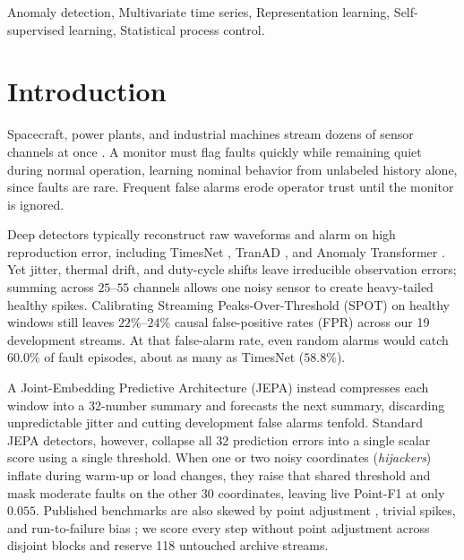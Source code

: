 \documentclass[journal]{IEEEtran}
\begin{document}
\begin{IEEEkeywords}
Anomaly detection, Multivariate time series, Representation learning, Self-supervised learning, Statistical process control.
\end{IEEEkeywords}

\section{Introduction}
\label{sec:intro}

Spacecraft, power plants, and industrial machines stream dozens of sensor channels at once \cite{meng2019spacecraft, chalapathy2019deep, cuellar2024explainable, Hundman2018b}. A monitor must flag faults quickly while remaining quiet during normal operation, learning nominal behavior from unlabeled history alone, since faults are rare. Frequent false alarms erode operator trust until the monitor is ignored.

Deep detectors typically reconstruct raw waveforms and alarm on high reproduction error, including TimesNet \cite{wu2023timesnet}, TranAD \cite{tuli2022tranad}, and Anomaly Transformer \cite{xu2022anomaly}. Yet jitter, thermal drift, and duty-cycle shifts leave irreducible observation errors; summing across $25\text{--}55$ channels allows one noisy sensor to create heavy-tailed healthy spikes. Calibrating Streaming Peaks-Over-Threshold (SPOT) \cite{siffer2017anomaly} on healthy windows still leaves $22\%\text{--}24\%$ causal false-positive rates (FPR) across our 19 development streams. At that false-alarm rate, even random alarms would catch $60.0\%$ of fault episodes, about as many as TimesNet ($58.8\%$).

A Joint-Embedding Predictive Architecture (JEPA) \cite{lecun2022path, assran2023self, bardes2024vjepa} instead compresses each window into a 32-number summary and forecasts the next summary, discarding unpredictable jitter and cutting development false alarms tenfold. Standard JEPA detectors, however, collapse all 32 prediction errors into a single scalar score using a single threshold. When one or two noisy coordinates (\emph{hijackers}) inflate during warm-up or load changes, they raise that shared threshold and mask moderate faults on the other 30 coordinates, leaving live Point-F1 at only $0.055$. Published benchmarks are also skewed by point adjustment \cite{kim2022towards}, trivial spikes, and run-to-failure bias \cite{wu2023flawed}; we score every step without point adjustment across disjoint blocks and reserve 118 untouched archive streams.
\end{document}

